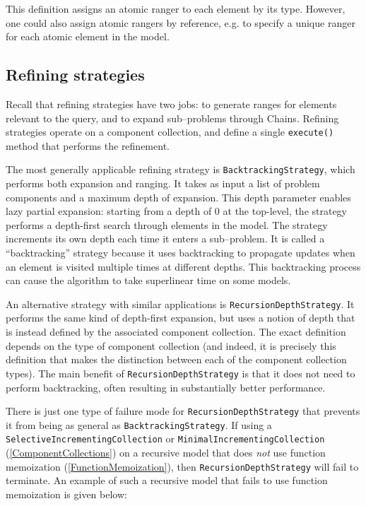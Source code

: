 This definition assigns an atomic ranger to each element by its type. However, one could also assign atomic rangers by reference, e.g. to specify a unique ranger for each atomic element in the model.

\subsection{Refining strategies}

Recall that refining strategies have two jobs: to generate ranges for elements relevant to the query, and to expand sub--problems through Chains. Refining strategies operate on a component collection, and define a single \texttt{execute()} method that performs the refinement.

The most generally applicable refining strategy is \texttt{Backtracking\-Strategy}, which performs both expansion and ranging. It takes as input a list of problem components and a maximum depth of expansion. This depth parameter enables lazy partial expansion: starting from a depth of 0 at the top-level, the strategy performs a depth-first search through elements in the model. The strategy increments its own depth each time it enters a sub--problem. It is called a ``backtracking'' strategy because it uses backtracking to propagate updates when an element is visited multiple times at different depths. This backtracking process can cause the algorithm to take superlinear time on some models.

An alternative strategy with similar applications is \texttt{RecursionDepth\-Strategy}. It performs the same kind of depth-first expansion, but uses a notion of depth that is instead defined by the associated component collection. The exact definition depends on the type of component collection (and indeed, it is precisely this definition that makes the distinction between each of the component collection types). The main benefit of \texttt{RecursionDepthStrategy} is that it does not need to perform backtracking, often resulting in substantially better performance.

There is just one type of failure mode for \texttt{RecursionDepthStrategy} that prevents it from being as general as \texttt{BacktrackingStrategy}. If using a \texttt{SelectiveIncrementingCollection} or \texttt{MinimalIncrementing\-Collection} (\ref{ComponentCollections}) on a recursive model that does \textit{not} use function memoization (\ref{FunctionMemoization}), then \texttt{RecursionDepthStrategy} will fail to terminate. An example of such a recursive model that fails to use function memoization is given below:

